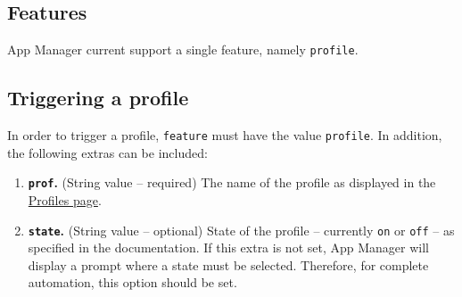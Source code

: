 \subsection{Features}\label{subsec:at:features} %
App Manager current support a single feature, namely \texttt{profile}.

\subsection{Triggering a profile}\label{subsec:triggering-a-profile} %
In order to trigger a profile, \texttt{feature} must have the value \texttt{profile}. In addition, the following extras can be included:
\begin{enumerate}
    \item \textbf{\texttt{prof}.} (String value -- required) The name of the profile as displayed in the \hyperref[sec:profiles-page]{Profiles page}.
    \item \textbf{\texttt{state}.} (String value -- optional) State of the profile -- currently \texttt{on} or \texttt{off} -- as specified in the documentation.
    If this extra is not set, App Manager will display a prompt where a state must be selected. Therefore, for complete automation,
    this option should be set.
\end{enumerate}
